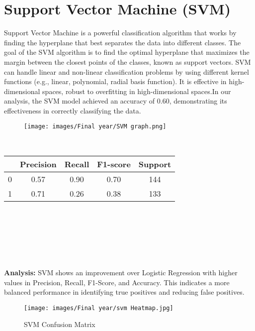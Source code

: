 \documentclass{report}
\begin{document}
{\section{Support Vector Machine (SVM)}
Support Vector Machine is a powerful classification algorithm that works by finding the hyperplane that best separates the data into different classes. The goal of the SVM algorithm is to find the optimal hyperplane that maximizes the margin between the closest points of the classes, known as support vectors. SVM can handle linear and non-linear classification problems by using different kernel functions (e.g., linear, polynomial, radial basis function). It is effective in high-dimensional spaces, robust to overfitting in high-dimensional spaces.In our analysis, the SVM model achieved an accuracy of 0.60, demonstrating its effectiveness in correctly classifying the data.
\vspace{1cm}
    \begin{figure}[h!]
    \centering
        \texttt{[image: images/Final year/SVM graph.png]} %
    \end{figure} \\
\begin{center}
\begin{tabular}{|c|c|c|c|c|}
  \hline
   & Precision & Recall & F1-score & Support \\
  \hline
  0 & 0.57 & 0.90 & 0.70 & 144 \\
  1 & 0.71 & 0.26 & 0.38 & 133 \\
  \hline
\end{tabular}
\end{center}
\\ \\ \\ \\ \\ \\
\textbf{Analysis: }   SVM shows an improvement over Logistic Regression with higher values in Precision, Recall, F1-Score, and Accuracy. This indicates a more balanced performance in identifying true positives and reducing false positives.
    \begin{figure}[h!] 
    \centering
        \texttt{[image: images/Final year/svm Heatmap.jpg]} %
        \caption{SVM Confusion Matrix}
    \end{figure}
\\ \\ \\ \\ \\ \\ \\ \\ \\
}
\end{document}
